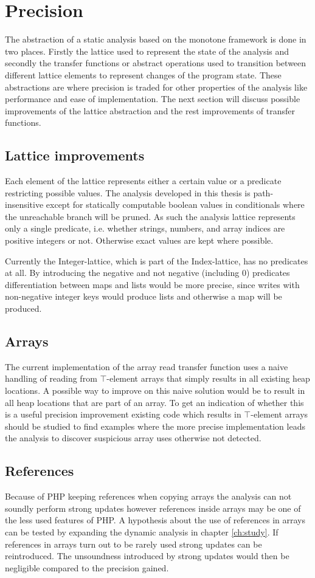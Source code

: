 \section{Precision}
The abstraction of a static analysis based on the monotone framework is done in two places. Firstly the lattice used to represent the state of the analysis and secondly the transfer functions or abstract operations used to transition between different lattice elements to represent changes of the program state. These abstractions are where precision is traded for other properties of the analysis like performance and ease of implementation. The next section will discuss possible improvements of the lattice abstraction and the rest improvements of transfer functions.

\subsection{Lattice improvements}
Each element of the lattice represents either a certain value or a predicate restricting possible values. The analysis developed in this thesis is path-insensitive except for statically computable boolean values in conditionals where the unreachable branch will be pruned. As such the analysis lattice represents only a single predicate, i.e. whether strings, numbers, and array indices are positive integers or not. Otherwise exact values are kept where possible. 

Currently the Integer-lattice, which is part of the Index-lattice, has no predicates at all. By introducing the negative and not negative (including 0) predicates differentiation between maps and lists would be more precise, since writes with non-negative integer keys would produce lists and otherwise a map will be produced.

\subsection{Arrays}
The current implementation of the array read transfer function uses a naive handling of reading from $\top$-element arrays that simply results in all existing heap locations. A possible way to improve on this naive solution would be to result in all heap locations that are part of an array. To get an indication of whether this is a useful precision improvement existing code which results in $\top$-element arrays should be studied to find examples where the more precise implementation leads the analysis to discover suspicious array uses otherwise not detected.

\subsection{References}
Because of PHP keeping references when copying arrays the analysis can not soundly perform strong updates however references inside arrays may be one of the less used features of PHP. A hypothesis about the use of references in arrays can be tested by expanding the dynamic analysis in chapter \ref{ch:study}. If references in arrays turn out to be rarely used strong updates can be reintroduced. The unsoundness introduced by strong updates would then be negligible compared to the precision gained.